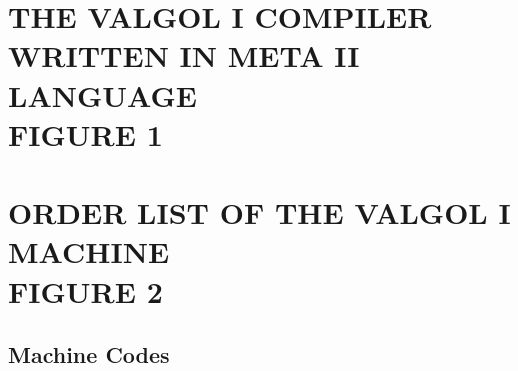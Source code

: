 \documentclass[twocolumn]{article}
\begin{document}
\pagebreak

\section{THE VALGOL I COMPILER WRITTEN IN META II LANGUAGE\\FIGURE 1}


\section{ORDER LIST OF THE VALGOL I MACHINE\\FIGURE 2}

\subsection{Machine Codes}
\end{document}
